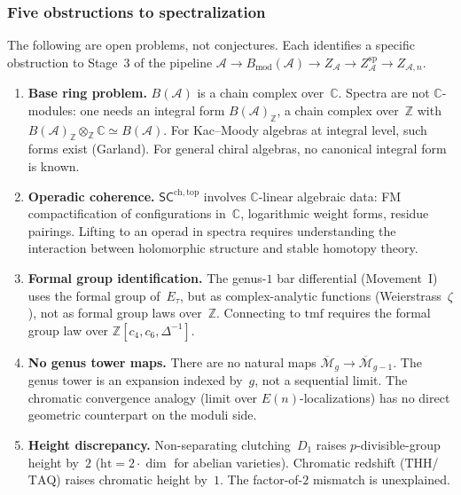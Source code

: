 \documentclass[11pt]{article}
\newcommand{\cA}{\mathcal{A}}
\newcommand{\C}{\mathbb{C}}
\newcommand{\Z}{\mathbb{Z}}
\newcommand{\SCchtop}{\mathsf{SC}^{\mathrm{ch,top}}}
\begin{document}
\subsubsection*{Five obstructions to spectralization}

The following are open problems, not conjectures.  Each identifies
a specific obstruction to Stage~3 of the pipeline
$\cA \to B_{\mathrm{mod}}(\cA) \to Z_\cA \to Z_\cA^{\mathrm{sp}}
\to Z_{\cA,n}$.

\begin{enumerate}
\item \textbf{Base ring problem.}
  $B(\cA)$ is a chain complex over~$\C$.  Spectra are not
  $\C$-modules: one needs an integral form $B(\cA)_\Z$, a chain
  complex over~$\Z$ with $B(\cA)_\Z \otimes_\Z \C \simeq B(\cA)$.
  For Kac--Moody algebras at integral level, such forms exist
  (Garland).  For general chiral algebras, no canonical integral
  form is known.

\item \textbf{Operadic coherence.}
  $\SCchtop$ involves $\C$-linear algebraic data: FM
  compactification of configurations in~$\C$, logarithmic weight
  forms, residue pairings.  Lifting to an operad in spectra
  requires understanding the interaction between holomorphic
  structure and stable homotopy theory.

\item \textbf{Formal group identification.}
  The genus-$1$ bar differential (Movement~I) uses the formal
  group of~$E_\tau$, but as complex-analytic functions
  (Weierstrass~$\zeta$), not as formal group laws over~$\Z$.
  Connecting to $\mathrm{tmf}$ requires the formal group law
  over $\Z[c_4, c_6, \Delta^{-1}]$.

\item \textbf{No genus tower maps.}
  There are no natural maps
  $\overline{\mathcal{M}}_g \to \overline{\mathcal{M}}_{g-1}$.
  The genus tower is an expansion indexed by~$g$, not a sequential
  limit.  The chromatic convergence analogy (limit over
  $E(n)$-localizations) has no direct geometric counterpart
  on the moduli side.

\item \textbf{Height discrepancy.}
  Non-separating clutching~$D_1$ raises $p$-divisible-group height
  by~$2$ ($\mathrm{ht} = 2 \cdot \dim$ for abelian varieties).
  Chromatic redshift ($\mathrm{THH}$/$\mathrm{TAQ}$) raises
  chromatic height by~$1$.  The factor-of-$2$ mismatch is
  unexplained.
\end{enumerate}
\end{document}
